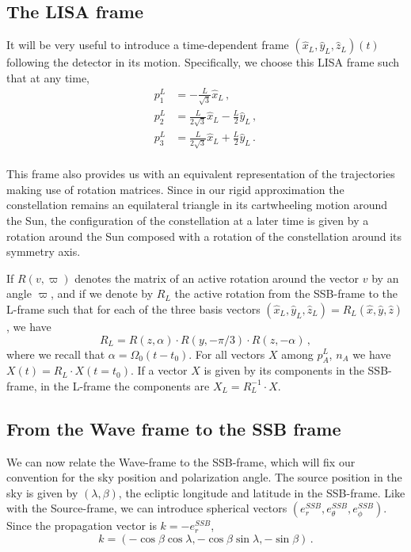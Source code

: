 \documentclass[aps,showpacs,twocolumn,prd,superscriptaddress,nofootinbib]{revtex4-1}
\newcommand{\be}{\begin{equation}}
\newcommand{\ee}{\end{equation}}
\newcommand{\bsub}{\begin{subequations}}
\newcommand{\esub}{\end{subequations}}
\begin{document}

\subsection{The LISA frame}
\label{sec:LISAframe}

It will be very useful to introduce a time-dependent frame $(\hat{x}_{L}, \hat{y}_{L}, \hat{z}_{L})(t)$ following the detector in its motion. Specifically, we choose this LISA frame such that at any time,
\bsub
\begin{align}
	p_{1}^{L} &= - \frac{L}{\sqrt{3}} \hat{x}_{L} \,,\\
	p_{2}^{L} &= \frac{L}{2\sqrt{3}} \hat{x}_{L} - \frac{L}{2} \hat{y}_{L} \,,\\
	p_{3}^{L} &= \frac{L}{2\sqrt{3}} \hat{x}_{L} + \frac{L}{2} \hat{y}_{L} \,.\\
\end{align}
\esub

This frame also provides us with an equivalent representation of the trajectories making use of rotation matrices. Since in our rigid approximation the constellation remains an equilateral triangle in its cartwheeling motion around the Sun, the configuration of the constellation at a later time is given by a rotation around the Sun composed with a rotation of the constellation around its symmetry axis.

If $R(v,\varpi)$ denotes the matrix of an active rotation around the vector $v$ by an angle $\varpi$, and if we denote by $R_{L}$ the active rotation from the SSB-frame to the L-frame such that for each of the three basis vectors $(\hat{x}_{L}, \hat{y}_{L}, \hat{z}_{L}) = R_{L} (\hat{x}, \hat{y}, \hat{z})$, we have
\be\label{eq:RL}
	R_{L} = R(z, \alpha) \cdot R(y, -\pi/3) \cdot R(z, -\alpha) \,,
\ee
where we recall that $\alpha = \Omega_{0} (t-t_{0}) $. For all vectors $X$ among $p_{A}^{L}$, $n_{A}$ we have $X(t) = R_{L} \cdot X(t=t_{0})$. If a vector $X$ is given by its components in the SSB-frame, in the L-frame the components are $X_{L} = R_{L}^{-1} \cdot X$.


\subsection{From the Wave frame to the SSB frame}
\label{sec:wavessbframe}

We can now relate the Wave-frame to the SSB-frame, which will fix our convention for the sky position and polarization angle. The source position in the sky is given by $(\lambda, \beta)$, the ecliptic longitude and latitude in the SSB-frame. Like with the Source-frame, we can introduce spherical vectors $(e_{r}^{SSB}, e_{\theta}^{SSB}, e_{\phi}^{SSB})$. Since the propagation vector is $k = - e_{r}^{SSB}$,
\be
	k = (- \cos\beta\cos\lambda, - \cos\beta\sin\lambda, -\sin\beta) \,.
\ee
\end{document}
